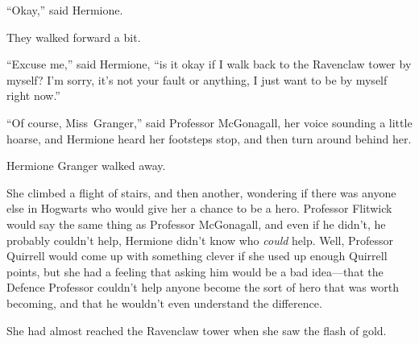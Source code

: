 “Okay,” said Hermione.

They walked forward a bit.

“Excuse me,” said Hermione, “is it okay if I walk back to the Ravenclaw tower by myself? I’m sorry, it’s not your fault or anything, I just want to be by myself right now.”

“Of course, Miss~Granger,” said Professor McGonagall, her voice sounding a little hoarse, and Hermione heard her footsteps stop, and then turn around behind her.

Hermione Granger walked away.

She climbed a flight of stairs, and then another, wondering if there was anyone else in Hogwarts who would give her a chance to be a hero. Professor Flitwick would say the same thing as Professor McGonagall, and even if he didn’t, he probably couldn’t help, Hermione didn’t know who \emph{could} help. Well, Professor Quirrell would come up with something clever if she used up enough Quirrell points, but she had a feeling that asking him would be a bad idea—that the Defence Professor couldn’t help anyone become the sort of hero that was worth becoming, and that he wouldn’t even understand the difference.

She had almost reached the Ravenclaw tower when she saw the flash of gold.
